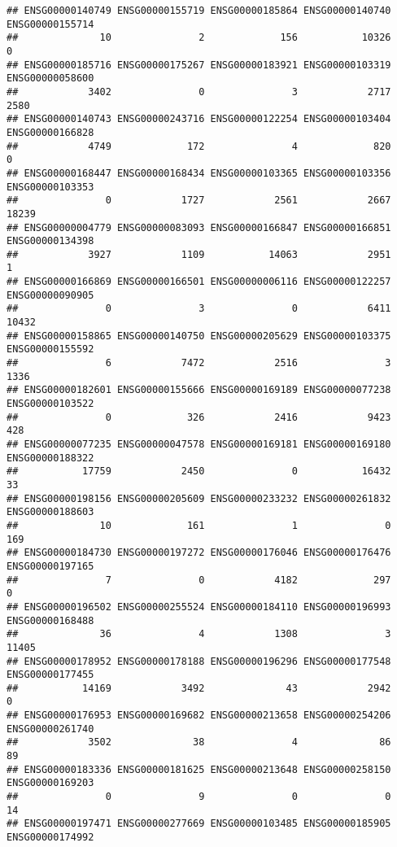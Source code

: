\documentclass[
]{article}
\begin{document}
\begin{verbatim}
## ENSG00000140749 ENSG00000155719 ENSG00000185864 ENSG00000140740 ENSG00000155714 
##              10               2             156           10326               0 
## ENSG00000185716 ENSG00000175267 ENSG00000183921 ENSG00000103319 ENSG00000058600 
##            3402               0               3            2717            2580 
## ENSG00000140743 ENSG00000243716 ENSG00000122254 ENSG00000103404 ENSG00000166828 
##            4749             172               4             820               0 
## ENSG00000168447 ENSG00000168434 ENSG00000103365 ENSG00000103356 ENSG00000103353 
##               0            1727            2561            2667           18239 
## ENSG00000004779 ENSG00000083093 ENSG00000166847 ENSG00000166851 ENSG00000134398 
##            3927            1109           14063            2951               1 
## ENSG00000166869 ENSG00000166501 ENSG00000006116 ENSG00000122257 ENSG00000090905 
##               0               3               0            6411           10432 
## ENSG00000158865 ENSG00000140750 ENSG00000205629 ENSG00000103375 ENSG00000155592 
##               6            7472            2516               3            1336 
## ENSG00000182601 ENSG00000155666 ENSG00000169189 ENSG00000077238 ENSG00000103522 
##               0             326            2416            9423             428 
## ENSG00000077235 ENSG00000047578 ENSG00000169181 ENSG00000169180 ENSG00000188322 
##           17759            2450               0           16432              33 
## ENSG00000198156 ENSG00000205609 ENSG00000233232 ENSG00000261832 ENSG00000188603 
##              10             161               1               0             169 
## ENSG00000184730 ENSG00000197272 ENSG00000176046 ENSG00000176476 ENSG00000197165 
##               7               0            4182             297               0 
## ENSG00000196502 ENSG00000255524 ENSG00000184110 ENSG00000196993 ENSG00000168488 
##              36               4            1308               3           11405 
## ENSG00000178952 ENSG00000178188 ENSG00000196296 ENSG00000177548 ENSG00000177455 
##           14169            3492              43            2942               0 
## ENSG00000176953 ENSG00000169682 ENSG00000213658 ENSG00000254206 ENSG00000261740 
##            3502              38               4              86              89 
## ENSG00000183336 ENSG00000181625 ENSG00000213648 ENSG00000258150 ENSG00000169203 
##               0               9               0               0              14 
## ENSG00000197471 ENSG00000277669 ENSG00000103485 ENSG00000185905 ENSG00000174992 

\end{verbatim}
\end{document}
